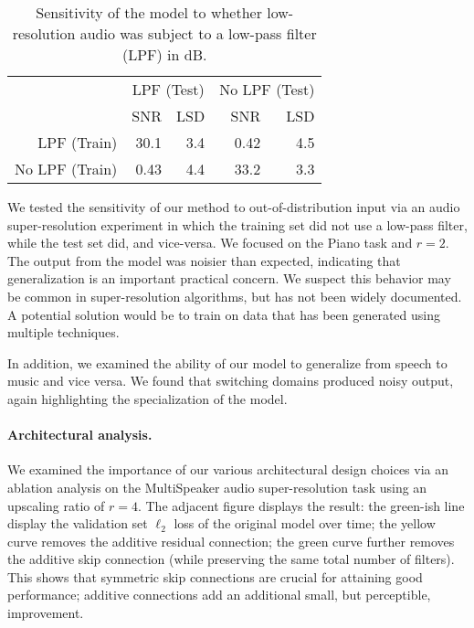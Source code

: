 \documentclass{article} \usepackage{iclr2017_workshop,times}
\begin{document}
\begin{wraptable}{r}{0.45\textwidth}
\vspace{-3mm}
\begin{small}
\begin{tabular}{rrrrr}
\hline
 & \multicolumn{2}{c}{LPF {\scriptsize (Test)}} & \multicolumn{2}{c}{No LPF {\scriptsize (Test)}} \\
  & SNR & LSD & SNR & LSD  \\
\hline
LPF {\scriptsize (Train)}  & 30.1 & 3.4 & 0.42 & 4.5   \\
No LPF {\scriptsize (Train)}  & 0.43 & 4.4 & 33.2 & 3.3  \\
\hline
\end{tabular}
\caption{Sensitivity of the model to whether low-resolution audio was subject to a low-pass filter (LPF) in dB.
}\label{scaling}
\vspace{-1mm}
\end{small}
\end{wraptable}

We tested the sensitivity of our method to out-of-distribution input via an audio super-resolution experiment in which the training set did not use a low-pass filter, while the test set did, and vice-versa.
We focused on the {\sc Piano} task and $r=2$. The output from the model was noisier than expected, indicating that generalization is an important practical concern. 
We suspect this behavior may be common in super-resolution algorithms, but has not been widely documented. A potential solution would be to train on data that has been generated using multiple techniques.

In addition, we examined the ability of our model to generalize from speech to music and vice versa. 
We found that switching domains produced noisy output, again highlighting the specialization of the model.






\paragraph{Architectural analysis.}


We examined the importance of our various architectural design choices via an ablation analysis on the {\sc MultiSpeaker} audio super-resolution task using an upscaling ratio of $r=4$. The adjacent figure displays the result: the green-ish line display the validation set $\ell_2$ loss of the original model over time; the yellow curve removes the additive residual connection; the green curve further removes the additive skip connection (while preserving the same total number of filters). This shows that symmetric skip connections are crucial for attaining good performance; additive connections add an additional small, but perceptible, improvement.
\end{document}
